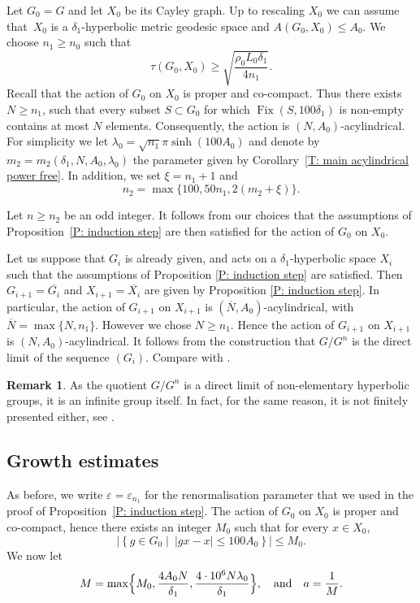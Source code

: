 \documentclass[11pt]{article}
\theoremstyle{plain}
\theoremstyle{definition}
\newtheorem{rem}[thm]{Remark}
\DeclareMathOperator{\Fix}{Fix}
\newcommand{\q}[1]{\overline{#1}}
\begin{document}
Let $G_0=G$ and let $X_0$ be its Cayley graph.
Up to rescaling $X_0$ we can assume that~$X_0$ is a $\delta_1$-hyperbolic metric geodesic space and $A(G_0, X_0) \leq A_0$.
We choose $n_1 \geq n_0$ such that
\begin{equation*}
\tau(G_0, X_0) \geq \sqrt{\frac{\rho_0 L_0 \delta_1}{4n_1}}.
\end{equation*}
Recall that the action of $G_0$ on $X_0$ is proper and co-compact.
Thus there exists $N \geq n_1$, such that every subset $S \subset G_0$ for which $\Fix(S,100\delta_1)$ is non-empty contains at most $N$ elements.
Consequently, the action is $(N, A_0)$-acylindrical.
For simplicity we let $\lambda_0 = \sqrt{n_1} \pi \sinh\left( 100A_0\right)$ and denote by $m_2 = m_2(\delta_1, N, A_0, \lambda_0)$ the parameter given by Corollary~\ref{T: main acylindrical power free}.
In addition, we set $\xi = n_1 + 1$ and
\begin{equation*}
n_2 = \max\{ 100, 50n_1, 2(m_2 + \xi)\}.
\end{equation*}

Let $n \geq n_2$ be an odd integer.
It follows from our choices that the assumptions of Proposition~\ref{P: induction step} are then satisfied for the action of $G_0$ on $X_0$.

Let us suppose that $G_i$ is already given, and acts on a $\delta_1$-hyperbolic space $X_i$ such that the assumptions of Proposition \ref{P: induction step} are satisfied. Then $G_{i+1}=\q {G_{i}}$ and $X_{i+1}= \q {X_i}$ are given by Proposition \ref{P: induction step}.
In particular, the action of $G_{i+1}$ on $X_{i+1}$ is $(\q N, A_0)$-acylindrical, with $\q N = \max\{ N , n_1\}$.
However we chose $N \geq n_1$.
Hence the action of $G_{i+1}$ on $X_{i+1}$ is $(N,A_0)$-acylindrical.
It follows from the construction that $G/G^n$ is the direct limit of the sequence $(G_i)$. Compare with \cite[Th.\,7.7]{coulon_geometry_2014}.

\begin{rem} As the quotient $G/G^n$ is a direct limit of non-elementary hyperbolic groups, it is an infinite group itself. In fact, for the same reason, it is not finitely presented either, see \cite[Th.\,7.7]{coulon_geometry_2014}.
\end{rem}

\subsection{Growth estimates}
\label{sec: growth estimates}
As before, we write $\varepsilon = \varepsilon_{n_1}$ for the renormalisation parameter that we used in the proof of Proposition~\ref{P: induction step}.
The action of $G_0$ on $X_0$ is proper and co-compact, hence there exists an integer $M_0$ such that for every $x \in X_0$,
\begin{equation*}
\left| \left\{ g \in G_0 \mid \ |gx - x| \leq100 A_0\right\}\right| \leq M_0.
\end{equation*}
We now let
\begin{equation*}
M = \max \Bigl\{
M_0,
\frac{4A_0N}{\delta_1},
\frac{4\cdot 10^6 N \lambda_0}{\delta_1}
\Bigr\},
\quad \text{and} \quad
a = \frac 1M.
\end{equation*}
\end{document}
